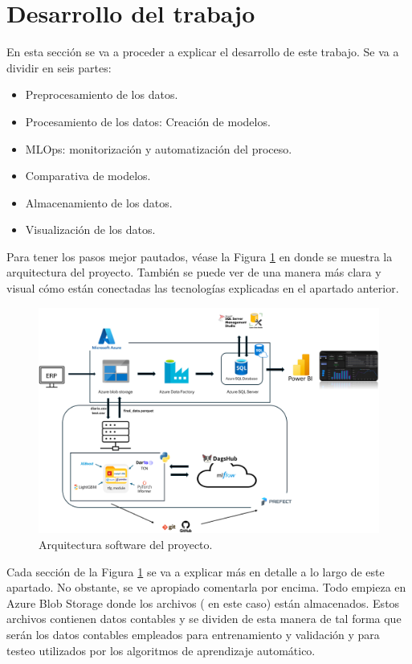 
\section{Desarrollo del trabajo}  

\label{desarrollo}
En esta sección se va a proceder a explicar el desarrollo de este trabajo. Se va a dividir en seis partes:
\begin{itemize}
    \item Preprocesamiento de los datos.
    \item Procesamiento de los datos: Creación de modelos.
    \item MLOps: monitorización y automatización del proceso.
    \item Comparativa de modelos.
    \item Almacenamiento de los datos.
    \item Visualización de los datos.
\end{itemize}

Para tener los pasos mejor pautados, véase la Figura \ref{arquitectura} en donde se muestra la arquitectura del proyecto. También se puede ver de una manera más clara y visual cómo están conectadas las tecnologías explicadas en el apartado anterior.
\begin{figure}[H]
    \centering
    \includegraphics[scale = 0.6]{imgs/Arquitectura.png}
    \caption{Arquitectura software del proyecto.}
    \label{arquitectura}
\end{figure}

Cada sección de la Figura \ref{arquitectura} se va a explicar más en detalle a lo largo de este apartado.  No obstante, se ve apropiado comentarla por encima. Todo empieza en Azure Blob Storage donde los archivos ( en este caso) están almacenados. Estos archivos contienen datos contables y se dividen de esta manera de tal forma que  serán los datos contables empleados para entrenamiento y validación y  para testeo utilizados por los algoritmos de aprendizaje automático.

